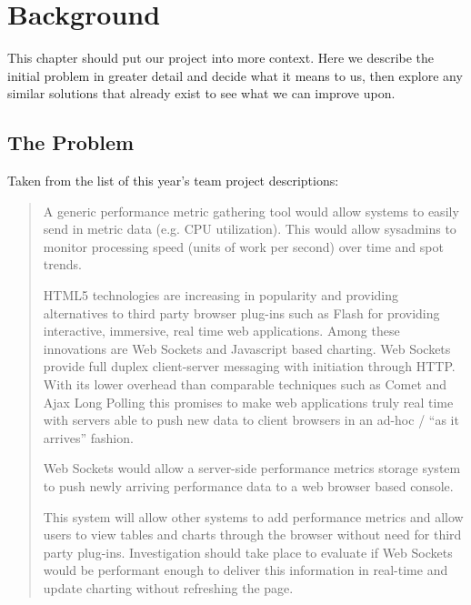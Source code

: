 \documentclass{l3proj}
\begin{document}


\chapter{Background}
\label{background}

This chapter should put our project into more context. Here we describe the initial problem in greater detail and decide what it means to us, then explore any similar solutions that already exist to see what we can improve upon.


\section{The Problem}
\label{section:problem}


Taken from the list of this year's team project descriptions:

\begin{quotation}
A generic performance metric gathering tool would allow systems to easily send in metric data (e.g. CPU utilization). This would allow sysadmins to monitor processing speed (units of work per second) over time and spot trends.

HTML5 technologies are increasing in popularity and providing alternatives to third party browser plug-ins such as Flash for providing interactive, immersive, real time web applications. Among these innovations are Web Sockets and Javascript based charting.
Web Sockets provide full duplex client-server messaging with initiation through HTTP. With its lower overhead than comparable techniques such as Comet and Ajax Long Polling this promises to make web applications truly real time with servers able to push new data to client browsers in an ad-hoc / ``as it arrives'' fashion.

Web Sockets would allow a server-side performance metrics storage system to push newly arriving performance data to a web browser based console.

This system will allow other systems to add performance metrics and allow users to view tables and charts through the browser without need for third party plug-ins. Investigation should take place to evaluate if Web Sockets would be performant enough to deliver this information in real-time and update charting without refreshing the page.
\end{quotation}
\end{document}

